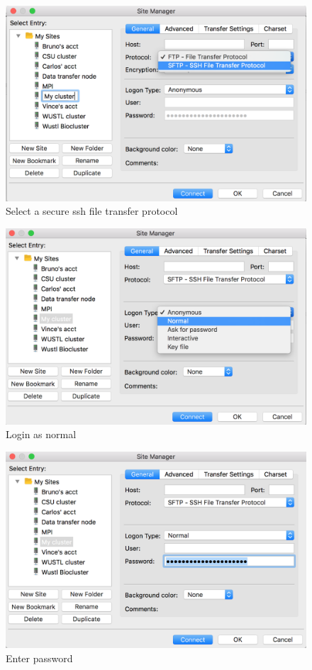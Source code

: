 \documentclass[]{book}
\theoremstyle{definition}
\theoremstyle{definition}
\theoremstyle{remark}
\begin{document}
\begin{figure}
\centering
\includegraphics{SFTP.png}
\caption{Select a secure ssh file transfer protocol}
\end{figure}

\begin{figure}
\centering
\includegraphics{Choose normal.png}
\caption{Login as normal}
\end{figure}

\begin{figure}
\centering
\includegraphics{Enter password.png}
\caption{Enter password}
\end{figure}
\end{document}
